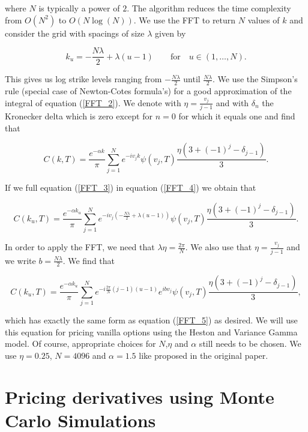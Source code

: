 \documentclass[12pt,a4paper,oneside]{book}
\begin{document}
where $N$ is typically a power of $2$.  The algorithm reduces the time complexity from $O(N^2)$ to $O(N \log(N))$. We use the FFT to return $N$ values of $k$ and consider the grid with spacings of size $\lambda$ given by

\begin{equation}\label{FFT_3}
k_u = -\dfrac{N \lambda}{2}  + \lambda(u-1)   \qquad \text{for} \quad u \in (1,\ldots,N).
\end{equation}

This gives us log strike levels ranging from $-\frac{N \lambda}{2}$ until $\frac{N \lambda}{2}$. We use the Simpson's rule (special case of Newton-Cotes formula's) for a good approximation of the integral of equation (\ref{FFT_2}). We denote with $\eta = \frac{v_j}{j-1}$ and with $\delta_{n}$ the Kronecker delta which is zero except for $n =0$ for which it equals one and find that

\begin{equation}\label{FFT_4}
C(k,T) = \dfrac{e^{-\alpha k}}{\pi} \sum\limits^{N}_{j=1} e^{-iv_jk} \psi(v_j,T) \dfrac{\eta(3+(-1)^j-\delta_{j-1})}{3}.
\end{equation}

If we full equation (\ref{FFT_3}) in equation (\ref{FFT_4}) we obtain that 

\begin{equation}\label{FFT_6}
C(k_u,T) = \dfrac{e^{-\alpha k_u}}{\pi} \sum\limits^{N}_{j=1} e^{-iv_j \left( -\frac{N \lambda}{2}  + \lambda(u-1)\right)} \psi(v_j,T) \dfrac{\eta(3+(-1)^j-\delta_{j-1})}{3}.
\end{equation}

In order to apply the FFT, we need that $\lambda \eta = \frac{2\pi}{N}$. We also use that $\eta = \frac{v_j}{j-1}$  and we write $b =\frac{N \lambda}{2} $. We find that 

\begin{equation}
C(k_u,T) = \dfrac{e^{-\alpha k_u}}{\pi} \sum\limits^{N}_{j=1} e^{-i\frac{2\pi}{N}(j-1)(u-1)}e^{ibv_j} \psi(v_j,T) \dfrac{\eta(3+(-1)^j-\delta_{j-1})}{3},
\end{equation}

which has exactly the same form as equation (\ref{FFT_5}) as desired. We will use this equation for pricing vanilla options using the Heston and Variance Gamma model. Of course, appropriate choices for $N$,$\eta$ and $\alpha$ still needs to be chosen. We use $\eta = 0.25$, $N =4096$ and $\alpha = 1.5$ like proposed in the original paper.

\section{Pricing derivatives using Monte Carlo Simulations}\label{derivativesMCS}
\end{document}

